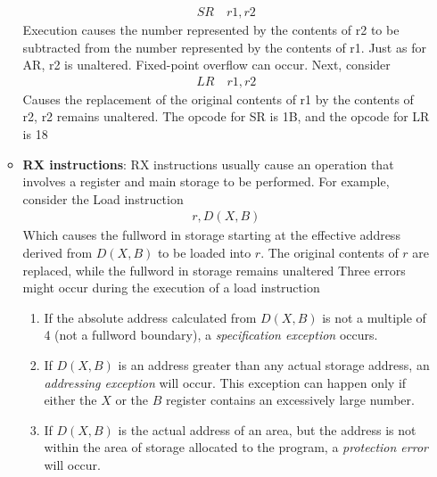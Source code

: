 \documentclass{report}
\begin{document}
\begin{itemize}
\begin{itemize}
                    \begin{align*}
                        SR \quad r1,r2
                    \end{align*}
                    Execution causes the number represented by the contents of r2 to be subtracted from the number represented by the contents of r1. Just as for AR, r2 is unaltered. Fixed-point overflow can occur. Next, consider
                    \begin{align*}
                        LR \quad r1,r2
                    \end{align*}
                    Causes the replacement of the original contents of r1 by the contents of r2, r2 remains unaltered.
                    \bigbreak \noindent 
                    The opcode for SR is 1B, and the opcode for LR is 18
                \item \textbf{RX instructions}: RX instructions usually cause an operation that involves a register and main storage to be performed. For example, consider the Load instruction
                    \begin{align*}
                        r,D(X,B)
                    \end{align*}
                    Which causes the fullword in storage starting at the effective address derived from $D(X,B)$ to be loaded into $r$. The original contents of $r$ are replaced, while the fullword in storage remains unaltered
                    \bigbreak \noindent 
                    Three errors might occur during the execution of a load instruction
                    \begin{enumerate}
                        \item If the absolute address calculated from \( D(X, B) \) is not a multiple of 4 (not a fullword boundary), a \textit{specification exception} occurs.
                        \item If \( D(X, B) \) is an address greater than any actual storage address, an \textit{addressing exception} will occur. This exception can happen only if either the \( X \) or the \( B \) register contains an excessively large number.
                        \item If \( D(X, B) \) is the actual address of an area, but the address is not within the area of storage allocated to the program, a \textit{protection error} will occur.
                    \end{enumerate}




            \end{itemize}
            
            











    \end{itemize}
\end{document}
